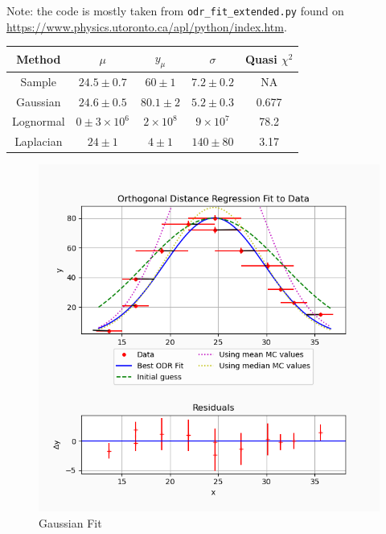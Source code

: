 \documentclass[12pt]{article}
\begin{document}
Note: the code is mostly taken from \verb|odr_fit_extended.py| found on \url{https://www.physics.utoronto.ca/apl/python/index.htm}.

\begin{center}
    \begin{table}\label{values}
    \begin{tabular}{|c||c|c|c|c|}
        \hline
        Method & $\mu$ & $y_\mu$ & $\sigma$ & Quasi $\chi^2$ \\
        \hline\hline
        Sample & $24.5 \pm 0.7$ & $60 \pm 1$ & $7.2 \pm 0.2$ & NA \\
        \hline
        Gaussian & $24.6 \pm 0.5$ & $80.1 \pm 2$ & $5.2 \pm 0.3$ & 0.677 \\
        \hline
        Lognormal & $0 \pm 3 \times 10^6$ & $2 \times 10^8$ & $9 \times 10^7$ & 78.2 \\
        \hline
        Laplacian & $24 \pm 1$ & $4 \pm 1$ & $140 \pm 80$ & 3.17 \\
        \hline
    \end{tabular}
\end{table}
\end{center}

\begin{figure}\label{gauss}
    \includegraphics[width=\textwidth]{gaussian.png}
    \caption{Gaussian Fit}
\end{figure}
\end{document}

